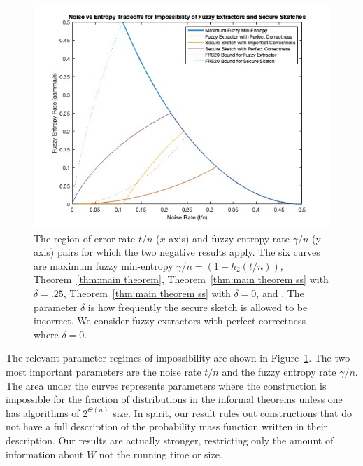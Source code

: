 \begin{figure}[t]
\centering
\includegraphics[width=.9\textwidth]{EntropyvsError.jpg}
\caption{The region of error rate $t/n$ ($x$-axis) and fuzzy entropy rate $\gamma/n$ (y-axis) pairs for which the two negative results apply.  The six curves are maximum fuzzy min-entropy $\gamma/n = (1-h_2(t/n))$, Theorem~\ref{thm:main theorem}, Theorem~\ref{thm:main theorem ss} with $\delta=.25$,  Theorem~\ref{thm:main theorem ss} with $\delta =0$, \cite[Theorem 5.1]{fuller2020fuzzy} and \cite[Theorem 7.2]{fuller2020fuzzy}. The parameter $\delta$ is how frequently the secure sketch is allowed to be incorrect.  We consider fuzzy extractors with perfect correctness where $\delta=0$.}
\label{fig:param regime}
\end{figure}
 The relevant parameter regimes of impossibility are shown in Figure~\ref{fig:param regime}.  The two most important parameters are the noise rate $t/n$ and the fuzzy entropy rate $\gamma/n$. The area under the curves represents parameters where the construction is impossible for the fraction of distributions in the informal theorems unless one has algorithms of $2^{\Theta(n)}$ size.
In spirit, our result rules out constructions that do not have a full description of the probability mass function written in their description.  Our results are actually stronger, restricting only the amount of information about $W$ not the running time or size.  


